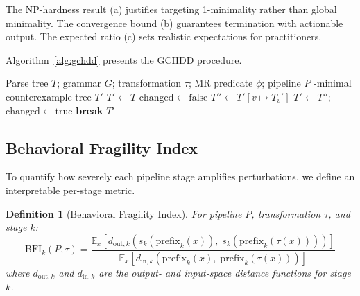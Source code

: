 \documentclass[sigconf,nonacm]{acmart}
\newtheorem{definition}[theorem]{Definition}
\begin{document}
The NP-hardness result (a) justifies targeting 1-minimality rather than global minimality.
The convergence bound (b) guarantees termination with actionable output.
The expected ratio (c) sets realistic expectations for practitioners.

Algorithm~\ref{alg:gchdd} presents the GCHDD procedure.

\begin{algorithm}[t]
\caption{Grammar-Constrained Hierarchical Delta Debugging (GCHDD)}
\label{alg:gchdd}
\begin{algorithmic}[1]
\REQUIRE Parse tree $T$; grammar $G$; transformation $\tau$; MR predicate $\phi$; pipeline $P$
-minimal counterexample tree $T'$
\STATE $T' \leftarrow T$
\REPEAT
    \STATE $\mathrm{changed} \leftarrow \mathrm{false}$
            \STATE $T'' \leftarrow T'[v \mapsto T_v']$ 
                    \STATE $T' \leftarrow T''$; \quad $\mathrm{changed} \leftarrow \mathrm{true}$
                    \STATE \textbf{break} 
                \ENDIF
            \ENDIF
        \ENDFOR
    \ENDFOR
{}
\RETURN $T'$
\end{algorithmic}
\end{algorithm}

\subsection{Behavioral Fragility Index}

To quantify how severely each pipeline stage amplifies perturbations, we define an interpretable per-stage metric.

\begin{definition}[Behavioral Fragility Index]
For pipeline $P$, transformation $\tau$, and stage $k$:
\begin{equation}\label{eq:bfi}
    \mathrm{BFI}_k(P, \tau) = \frac{\mathbb{E}_{x}\!\left[d_{\mathrm{out},k}(s_k(\mathrm{prefix}_k(x)),\; s_k(\mathrm{prefix}_k(\tau(x))))\right]}{\mathbb{E}_{x}\!\left[d_{\mathrm{in},k}(\mathrm{prefix}_k(x),\; \mathrm{prefix}_k(\tau(x)))\right]}
\end{equation}
where $d_{\mathrm{out},k}$ and $d_{\mathrm{in},k}$ are the output- and input-space distance functions for stage $k$.
\end{definition}
\end{document}
